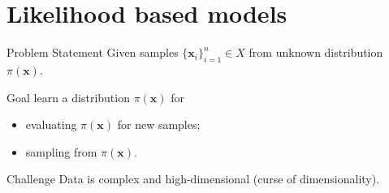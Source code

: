 \documentclass{beamer}
\newcommand{\bx}{\mathbf{x}}
\begin{document}
\section{Likelihood based models}
\begin{frame}{Problem Statement}
Given samples $\{\bx_i\}_{i=1}^n \in X$ from unknown distribution $\pi(\bx)$.

\begin{block}{Goal}
	learn a distribution $\pi(\bx)$ for 
	\begin{itemize}
	    \item evaluating $\pi(\bx)$ for new samples;
	    \item sampling from $\pi(\bx)$.
	\end{itemize}
\end{block}
\begin{block}{Challenge}
	 Data is complex and high-dimensional (curse of dimensionality).
\end{block}
\end{frame}
\end{document}
